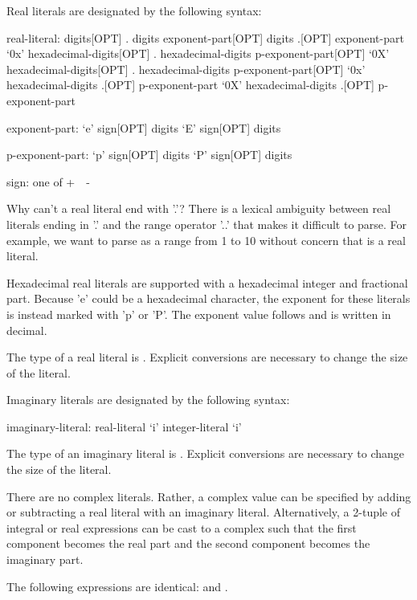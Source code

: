 Real literals are designated by the following syntax:
\begin{syntax}
real-literal:
  digits[OPT] . digits exponent-part[OPT]
  digits .[OPT] exponent-part
  `0x' hexadecimal-digits[OPT] . hexadecimal-digits p-exponent-part[OPT]
  `0X' hexadecimal-digits[OPT] . hexadecimal-digits p-exponent-part[OPT]
  `0x' hexadecimal-digits .[OPT] p-exponent-part
  `0X' hexadecimal-digits .[OPT] p-exponent-part

exponent-part:
  `e' sign[OPT] digits
  `E' sign[OPT] digits

p-exponent-part:
  `p' sign[OPT] digits
  `P' sign[OPT] digits


sign: one of
  + $ $ $ $ -
\end{syntax}

\begin{rationale}
Why can't a real literal end with '.'?  There is a lexical ambiguity
between real literals ending in '.' and the range operator '..' that
makes it difficult to parse.  For example, we want to
parse  as a range from 1 to 10 without concern
that  is a real literal.
\end{rationale}

Hexadecimal real literals are supported with a hexadecimal integer and
fractional part. Because 'e' could be a hexadecimal character, the exponent for
these literals is instead marked with 'p' or 'P'. The exponent value follows
and is written in decimal.

The type of a real literal is .  Explicit conversions are
necessary to change the size of the literal.

Imaginary literals are designated by the following syntax:

\begin{syntax}
imaginary-literal:
  real-literal `i'
  integer-literal `i'
\end{syntax}

The type of an imaginary literal is .  Explicit conversions
are necessary to change the size of the literal.

There are no complex literals.  Rather, a complex value can be
specified by adding or subtracting a real literal with an imaginary
literal.  Alternatively, a 2-tuple of integral or real expressions can
be cast to a complex such that the first component becomes the real
part and the second component becomes the imaginary part.
\begin{example}
The following expressions are identical: 
and .
\end{example}


